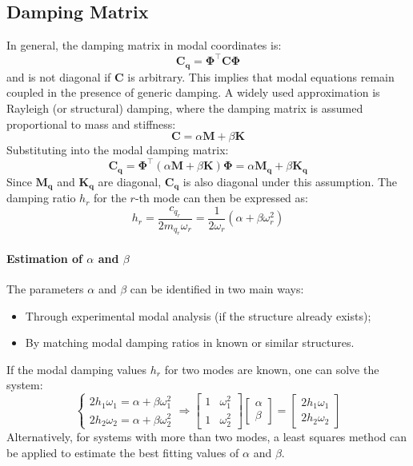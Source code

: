 \subsection{Damping Matrix}

In general, the damping matrix in modal coordinates is:
\[
\boldsymbol{C_q} = \boldsymbol{\Phi}^\top \boldsymbol{C} \boldsymbol{\Phi}
\]
and is not diagonal if \( \boldsymbol{C} \) is arbitrary. This implies that modal equations remain coupled in the presence of generic damping. A widely used approximation is Rayleigh (or structural) damping, where the damping matrix is assumed proportional to mass and stiffness:
\[
\boldsymbol{C} = \alpha \boldsymbol{M} + \beta \boldsymbol{K}
\]
Substituting into the modal damping matrix:
\[
\boldsymbol{C_q} = \boldsymbol{\Phi}^\top (\alpha \boldsymbol{M} + \beta \boldsymbol{K}) \boldsymbol{\Phi}
= \alpha \boldsymbol{M_q} + \beta \boldsymbol{K_q}
\]
Since \( \boldsymbol{M_q} \) and \( \boldsymbol{K_q} \) are diagonal, \( \boldsymbol{C_q} \) is also diagonal under this assumption. The damping ratio \( h_r \) for the \( r \)-th mode can then be expressed as:
\[
h_r = \frac{c_{q_r}}{2 m_{q_r} \omega_r}
= \frac{1}{2 \omega_r} (\alpha + \beta \omega_r^2)
\]

\paragraph{Estimation of \( \alpha \) and \( \beta \)}

The parameters \( \alpha \) and \( \beta \) can be identified in two main ways:
\begin{itemize}
  \item Through experimental modal analysis (if the structure already exists);
  \item By matching modal damping ratios in known or similar structures.
\end{itemize}

If the modal damping values \( h_r \) for two modes are known, one can solve the system:
\[
\begin{cases}
2 h_1 \omega_1 = \alpha + \beta \omega_1^2 \\
2 h_2 \omega_2 = \alpha + \beta \omega_2^2
\end{cases}
\Rightarrow
\begin{bmatrix}
1 & \omega_1^2 \\
1 & \omega_2^2
\end{bmatrix}
\begin{bmatrix}
\alpha \\
\beta
\end{bmatrix}
=
\begin{bmatrix}
2 h_1 \omega_1 \\
2 h_2 \omega_2
\end{bmatrix}
\]
Alternatively, for systems with more than two modes, a least squares method can be applied to estimate the best fitting values of \( \alpha \) and \( \beta \).

